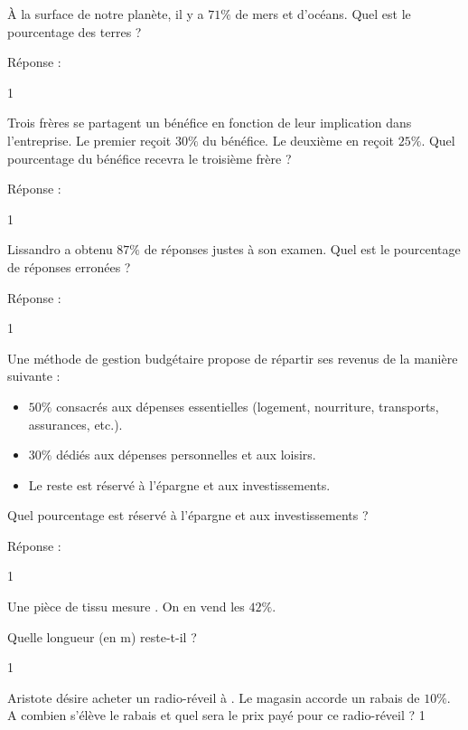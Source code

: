\documentclass[a4paper,11pt]{report}
\begin{document}
\begin{exop}{
À la surface de notre planète, il y a $71\%$ de mers et d'océans. Quel est le pourcentage des terres ?

Réponse : \hrulefill
}{1}    
\end{exop}


\begin{exop}{
Trois frères se partagent un bénéfice en fonction de leur implication dans l'entreprise. Le premier reçoit $30\%$ du bénéfice. Le deuxième en reçoit $25\%$. Quel pourcentage du bénéfice recevra le troisième frère ?

Réponse : \hrulefill
}{1}    
\end{exop}

\begin{exop}{
Lissandro a obtenu $87\%$ de réponses justes à son examen. Quel est le pourcentage de réponses erronées ?

Réponse : \hrulefill
}{1}    
\end{exop}


\begin{exop}{
Une méthode de gestion budgétaire propose de répartir ses revenus de la manière suivante :
\begin{itemize}
    \item $50 \%$ consacrés aux dépenses essentielles (logement, nourriture, transports, assurances, etc.).
    \item $30 \%$ dédiés aux dépenses personnelles et aux loisirs.
    \item Le reste est réservé à l'épargne et aux investissements.
\end{itemize}

Quel pourcentage est réservé à l'épargne et aux investissements ?

Réponse : \hrulefill
}{1}    
\end{exop}



\begin{exo}{
Une pièce de tissu mesure . On en vend les $42\%$.

Quelle longueur (en m) reste-t-il ?
}{1}    
\end{exo}

\begin{exo}{
Aristote désire acheter un radio-réveil à . Le magasin accorde un rabais de $10\%$. A combien s'élève le rabais et quel sera le prix payé pour ce radio-réveil ?
}{1}
\end{exo}
\end{document}
